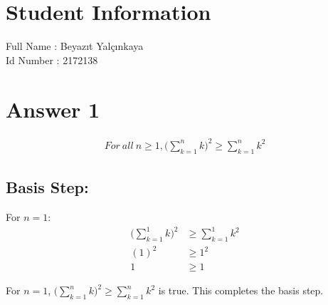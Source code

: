 \documentclass[12pt]{article}
\begin{document}
\section*{Student Information } 
Full Name : Beyazıt Yalçınkaya \\
Id Number : 2172138 \\

\section*{Answer 1}

    \begin{equation} 
    \label{eq1}
    \begin{split}
        For \ all \ n \geq 1, \Bigg(\sum_{k = 1}^{n} k \Bigg)^2 \geq \sum_{k = 1}^{n} k^2
    \end{split}
    \end{equation}
        
    \subsection*{Basis Step:}
        \qquad    
            For $n = 1$:
        \begin{equation} 
        \label{eq1}
        \begin{split}
            \Bigg(\sum_{k = 1}^{1} k\Bigg)^2 & \geq \sum_{k = 1}^{1} k^2 \\
            (1)^2 & \geq 1^2 \\
            1 & \geq 1
        \end{split}
        \end{equation}
        
        \qquad For $n = 1$, $\Big(\sum_{k = 1}^{n} k\Big)^2 \geq \sum_{k = 1}^{n} k^2$ is true. This completes the basis step.
    
\end{document}
